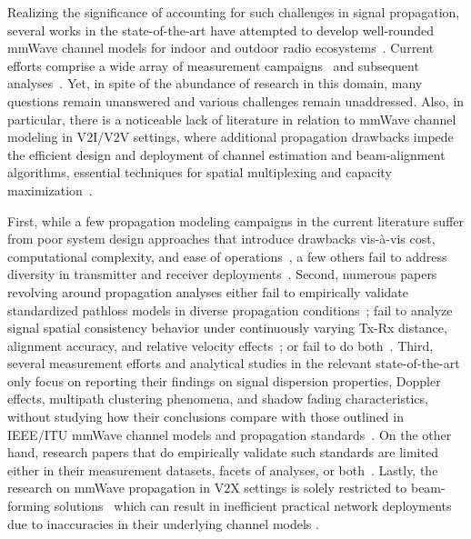 \documentclass[12pt, draftcls, onecolumn]{IEEEtran}
\begin{document}
Realizing the significance of accounting for such challenges in signal propagation, several works in the state-of-the-art have attempted to develop well-rounded mmWave channel models for indoor and outdoor radio ecosystems~\cite{NISTModeling, Outdoor28G, Indoor60G, QDC_NIST, D2DHumanBlockage}. Current efforts comprise a wide array of measurement campaigns~\cite{Purdue, Foliage, AgileLink, Harvard, Outdoor28G, PDAPs, MolischSpatialIndoorOutdoor, DopplerHST} and subsequent analyses~\cite{SuburbanGeometryJournal, FoliageSimulations, Indoor60G, Qualcomm3GPP, MacCartneyModelsOverview, SpatialConsistencyOriginal, MacCartneyRural, MolischEstimate}. Yet, in spite of the abundance of research in this domain, many questions remain unanswered and various challenges remain unaddressed. Also, in particular, there is a noticeable lack of literature in relation to mmWave channel modeling in V$2$I/V$2$V settings, where additional propagation drawbacks impede the efficient design and deployment of channel estimation and beam-alignment algorithms, essential techniques for spatial multiplexing and capacity maximization~\cite{VehicularBeamSelection, CVBeamAlignmentV2X}. 

First, while a few propagation modeling campaigns in the current literature suffer from poor system design approaches that introduce drawbacks vis-\`{a}-vis cost, computational complexity, and ease of operations~\cite{Purdue, Foliage, AgileLink}, a few others fail to address diversity in transmitter and receiver deployments~\cite{Harvard, Indoor60G, MacCartneyRural}. Second, numerous papers revolving around propagation analyses either fail to empirically validate standardized pathloss models in diverse propagation conditions~\cite{SpatialConsistencyOriginal, MolischSpatialOutdoor, MacCartneySpatialStatistics}; fail to analyze signal spatial consistency behavior under continuously varying Tx-Rx distance, alignment accuracy, and relative velocity effects~\cite{Outdoor28G, Qualcomm3GPP, MacCartneyModelsOverview}; or fail to do both~\cite{Indoor60G, SuburbanGeometryJournal, FoliageSimulations}. Third, several measurement efforts and analytical studies in the relevant state-of-the-art only focus on reporting their findings on signal dispersion properties, Doppler effects, multipath clustering phenomena, and shadow fading characteristics, without studying how their conclusions compare with those outlined in IEEE/ITU mmWave channel models and propagation standards~\cite{PDAPs, DopplerHST, Outdoor28G, SpatialDynamics, V2XBlockages}. On the other hand, research papers that do empirically validate such standards are limited either in their measurement datasets, facets of analyses, or both~\cite{Indoor60G, NISTModeling, QDC_NIST, D2DHumanBlockage}. Lastly, the research on mmWave propagation in V$2$X settings is solely restricted to beam-forming solutions~\cite{VehicularBeamSelection, CVBeamAlignmentV2X} which can result in inefficient practical network deployments due to inaccuracies in their underlying channel models \cite{MolischEstimate, IoV}.
\end{document}

